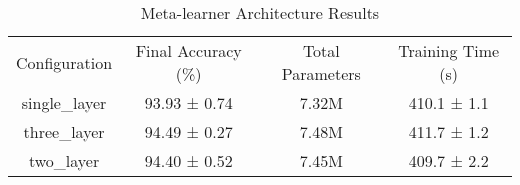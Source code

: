 \begin{table}
    \centering
    \begin{tabular}{cccc}
        Configuration & Final Accuracy (\%) & Total Parameters & Training Time (s) \\
        single_layer & 93.93 ± 0.74 & 7.32M & 410.1 ± 1.1 \\
        three_layer & 94.49 ± 0.27 & 7.48M & 411.7 ± 1.2 \\
        two_layer & 94.40 ± 0.52 & 7.45M & 409.7 ± 2.2 \\
    \end{tabular}
    \caption{Meta-learner Architecture Results}
    \label{tab:meta_learner}
\end{table}